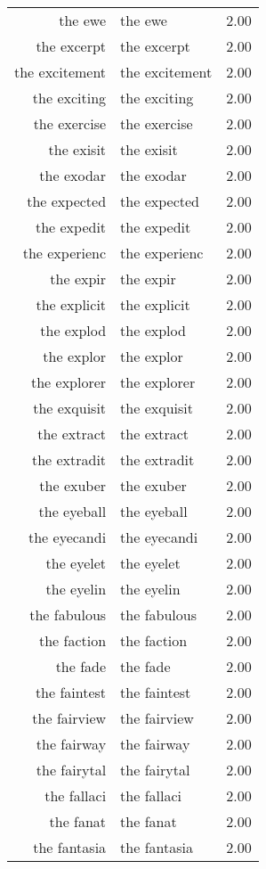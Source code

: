 \begin{table}[ht]
\begin{tabular}{rlr}
  the ewe & the ewe & 2.00 \\ 
  the excerpt & the excerpt & 2.00 \\ 
  the excitement & the excitement & 2.00 \\ 
  the exciting & the exciting & 2.00 \\ 
  the exercise & the exercise & 2.00 \\ 
  the exisit & the exisit & 2.00 \\ 
  the exodar & the exodar & 2.00 \\ 
  the expected & the expected & 2.00 \\ 
  the expedit & the expedit & 2.00 \\ 
  the experienc & the experienc & 2.00 \\ 
  the expir & the expir & 2.00 \\ 
  the explicit & the explicit & 2.00 \\ 
  the explod & the explod & 2.00 \\ 
  the explor & the explor & 2.00 \\ 
  the explorer & the explorer & 2.00 \\ 
  the exquisit & the exquisit & 2.00 \\ 
  the extract & the extract & 2.00 \\ 
  the extradit & the extradit & 2.00 \\ 
  the exuber & the exuber & 2.00 \\ 
  the eyeball & the eyeball & 2.00 \\ 
  the eyecandi & the eyecandi & 2.00 \\ 
  the eyelet & the eyelet & 2.00 \\ 
  the eyelin & the eyelin & 2.00 \\ 
  the fabulous & the fabulous & 2.00 \\ 
  the faction & the faction & 2.00 \\ 
  the fade & the fade & 2.00 \\ 
  the faintest & the faintest & 2.00 \\ 
  the fairview & the fairview & 2.00 \\ 
  the fairway & the fairway & 2.00 \\ 
  the fairytal & the fairytal & 2.00 \\ 
  the fallaci & the fallaci & 2.00 \\ 
  the fanat & the fanat & 2.00 \\ 
  the fantasia & the fantasia & 2.00 \\ 

\end{tabular}
\end{table}
